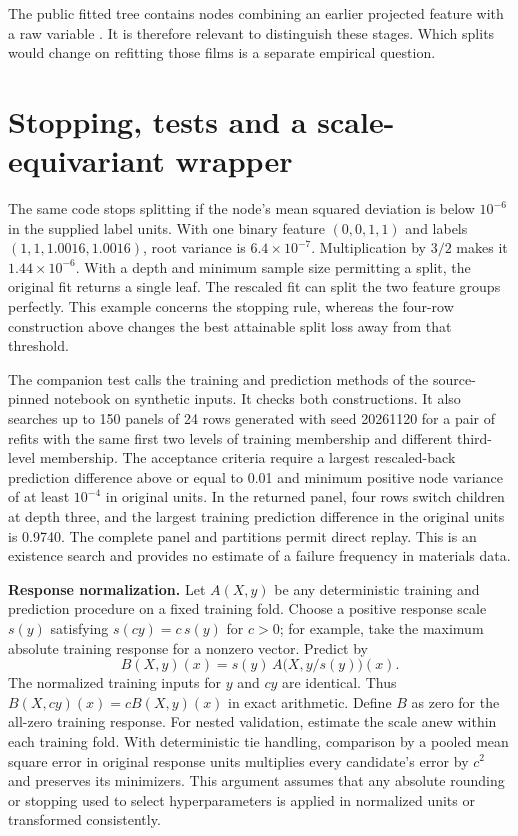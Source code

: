 \documentclass[11pt]{article}
\begin{document}
The public fitted tree contains nodes combining an earlier projected feature with a raw variable \cite{tree}. It is therefore relevant to distinguish these stages. Which splits would change on refitting those films is a separate empirical question.
\newpage
\section{Stopping, tests and a scale-equivariant wrapper}
The same code stops splitting if the node's mean squared deviation is below $10^{-6}$ in the supplied label units. With one binary feature $(0,0,1,1)$ and labels $(1,1,1.0016,1.0016)$, root variance is $6.4\times10^{-7}$. Multiplication by $3/2$ makes it $1.44\times10^{-6}$. With a depth and minimum sample size permitting a split, the original fit returns a single leaf. The rescaled fit can split the two feature groups perfectly. This example concerns the stopping rule, whereas the four-row construction above changes the best attainable split loss away from that threshold.

The companion test calls the training and prediction methods of the source-pinned notebook on synthetic inputs. It checks both constructions. It also searches up to 150 panels of 24 rows generated with seed 20261120 for a pair of refits with the same first two levels of training membership and different third-level membership. The acceptance criteria require a largest rescaled-back prediction difference above or equal to 0.01 and minimum positive node variance of at least $10^{-4}$ in original units. In the returned panel, four rows switch children at depth three, and the largest training prediction difference in the original units is 0.9740. The complete panel and partitions permit direct replay. This is an existence search and provides no estimate of a failure frequency in materials data.

\textbf{Response normalization.} Let $A(X,y)$ be any deterministic training and prediction procedure on a fixed training fold. Choose a positive response scale $s(y)$ satisfying $s(cy)=c\,s(y)$ for $c>0$; for example, take the maximum absolute training response for a nonzero vector. Predict by
\[
  B(X,y)(x)=s(y)\,A\bigl(X,y/s(y)\bigr)(x).
\]
The normalized training inputs for $y$ and $cy$ are identical. Thus $B(X,cy)(x)=cB(X,y)(x)$ in exact arithmetic. Define $B$ as zero for the all-zero training response. For nested validation, estimate the scale anew within each training fold. With deterministic tie handling, comparison by a pooled mean square error in original response units multiplies every candidate's error by $c^2$ and preserves its minimizers. This argument assumes that any absolute rounding or stopping used to select hyperparameters is applied in normalized units or transformed consistently.
\end{document}
